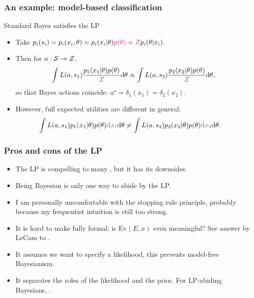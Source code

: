 \documentclass[10pt]{beamer}
\begin{document}
\begin{frame}
\frametitle{An example: model-based classification}
\end{frame}

\begin{frame}{Standard Bayes satisfies the LP}
\begin{itemize}
  \item Take $p_i(s_i) = p_i(x_i,\theta) = p_i(x_i\vert\theta)\textcolor{magenta}{p(\theta)} = \textcolor{magenta}{Z} p_i(\theta\vert x_i).$
  \item Then for $a:\mathcal{S}\rightarrow\mathcal{Z}$,
  $$ \int L(a,s_1) \frac{p_1(x_1\vert\theta)p(\theta)}{\textcolor{magenta}{Z}} {\rm d}\theta \propto \int L(a,s_2) \frac{p_2(x_2\vert\theta)p(\theta)}{\textcolor{magenta}{Z}} {\rm d}\theta, $$
  so that Bayes actions coincide: $a^\star = \delta_1(x_1) = \delta_2(x_2)$.
  \item However, full expected utilities are different in general:
  \begin{align*}
    \int L(a,s_1) p_1(x_1\vert\theta)p(\theta) \unn{\d x_1}\d\theta
    &\neq \int L(a,s_2) p_2(x_2\vert\theta)p(\theta) \unn{\d x_2}\d\theta.
  \end{align*}
\end{itemize}
\end{frame}

\begin{frame}
\frametitle{Pros and cons of the LP}
\begin{itemize}
  \item The LP is compelling to many \citep{BeWo88}, but it has its downsides.
  \item Being Bayesian is only one way to abide by the LP.
  \item I am personally uncomfortable with the stopping rule principle, probably because my frequentist intuition is still too strong.
  \item It is hard to make fully formal: is $\text{Ev}(E,x)$ even meaningful? See answer by LeCam to \citep{BeWo88}.
  \item It assumes we want to specify a likelihood, this prevents model-free Bayesianism.
  \item It separates the roles of the likelihood and the prior. For LP-abiding Bayesians, .
\end{itemize}
\end{frame}

\end{document}
